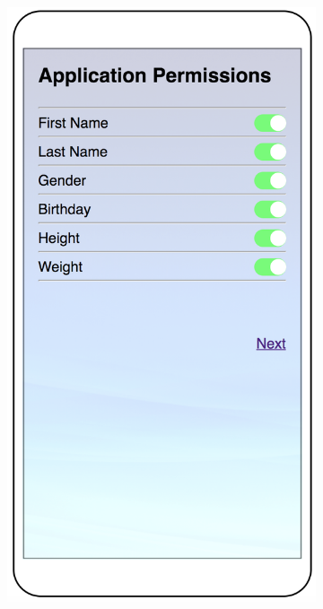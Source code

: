 %	
\begin{figure}
	\centering
	\begin{subfigure}[b]{0.24\textheight}
		\includegraphics[width=0.24\textheight]{figures/default1.png}

\end{subfigure}
\end{figure}
